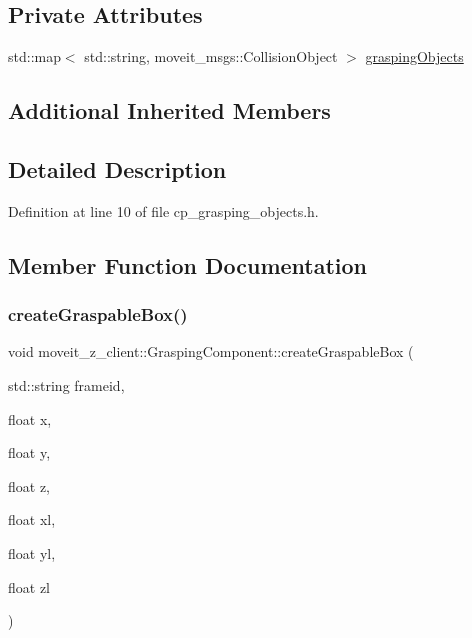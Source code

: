 \subsection*{Private Attributes}
\begin{DoxyCompactItemize}
\item 
std\+::map$<$ std\+::string, moveit\+\_\+msgs\+::\+Collision\+Object $>$ \hyperlink{classmoveit__z__client_1_1GraspingComponent_aca353c6a2eae807176c60bb9dfeea567}{grasping\+Objects}
\end{DoxyCompactItemize}
\subsection*{Additional Inherited Members}


\subsection{Detailed Description}


Definition at line 10 of file cp\+\_\+grasping\+\_\+objects.\+h.



\subsection{Member Function Documentation}
\mbox{\label{classmoveit__z__client_1_1GraspingComponent_ad480110e1d23a0be14a42cc29acfe3ad}} 
\subsubsection{\texorpdfstring{create\+Graspable\+Box()}{createGraspableBox()}}
{\footnotesize\ttfamily void moveit\+\_\+z\+\_\+client\+::\+Grasping\+Component\+::create\+Graspable\+Box (\begin{DoxyParamCaption}\item[{std\+::string}]{frameid,  }\item[{float}]{x,  }\item[{float}]{y,  }\item[{float}]{z,  }\item[{float}]{xl,  }\item[{float}]{yl,  }\item[{float}]{zl }\end{DoxyParamCaption})}



